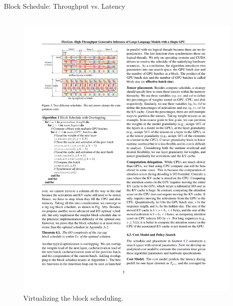 \begin{frame}{Block Schedule: Throughput vs. Latency}
    \begin{columns}[c]
        \begin{column}{.5\textwidth}
        \begin{figure}
            \centering
            \includegraphics[width=1.\textwidth]{./images/block-schedule.pdf}
            \caption{Virtualizing the block scheduling.}
        \end{figure}      
        \end{column}
    

\end{columns}
\end{frame}

